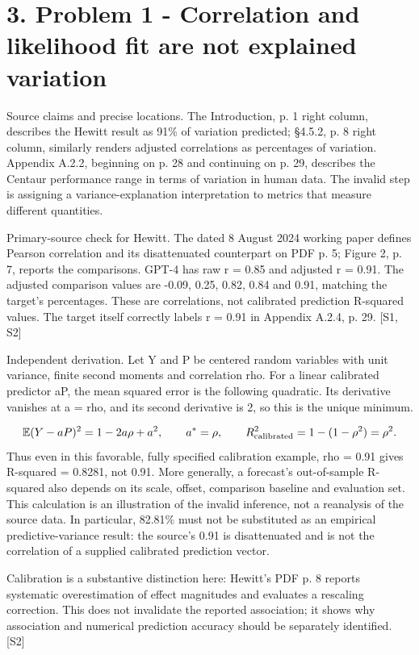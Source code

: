 \documentclass[10pt]{article}
\begin{document}
\section*{3. Problem 1 - Correlation and likelihood fit are not explained variation}
Source claims and precise locations. The Introduction, p. 1 right column, describes the Hewitt result as 91\% of variation predicted; §4.5.2, p. 8 right column, similarly renders adjusted correlations as percentages of variation. Appendix A.2.2, beginning on p. 28 and continuing on p. 29, describes the Centaur performance range in terms of variation in human data. The invalid step is assigning a variance-explanation interpretation to metrics that measure different quantities.\par
Primary-source check for Hewitt. The dated 8 August 2024 working paper defines Pearson correlation and its disattenuated counterpart on PDF p. 5; Figure 2, p. 7, reports the comparisons. GPT-4 has raw r = 0.85 and adjusted r = 0.91. The adjusted comparison values are -0.09, 0.25, 0.82, 0.84 and 0.91, matching the target’s percentages. These are correlations, not calibrated prediction R-squared values. The target itself correctly labels r = 0.91 in Appendix A.2.4, p. 29. [S1, S2]\par
Independent derivation. Let Y and P be centered random variables with unit variance, finite second moments and correlation rho. For a linear calibrated predictor aP, the mean squared error is the following quadratic. Its derivative vanishes at a = rho, and its second derivative is 2, so this is the unique minimum.\par
\[\mathbb{E}(Y-aP)^2=1-2a\rho+a^2,\qquad a^*=\rho,\qquad R^2_{\rm calibrated}=1-(1-\rho^2)=\rho^2.\] Thus even in this favorable, fully specified calibration example, rho = 0.91 gives R-squared = 0.8281, not 0.91. More generally, a forecast’s out-of-sample R-squared also depends on its scale, offset, comparison baseline and evaluation set. This calculation is an illustration of the invalid inference, not a reanalysis of the source data. In particular, 82.81\% must not be substituted as an empirical predictive-variance result: the source’s 0.91 is disattenuated and is not the correlation of a supplied calibrated prediction vector.\par
Calibration is a substantive distinction here: Hewitt’s PDF p. 8 reports systematic overestimation of effect magnitudes and evaluates a rescaling correction. This does not invalidate the reported association; it shows why association and numerical prediction accuracy should be separately identified. [S2]\par
\end{document}
